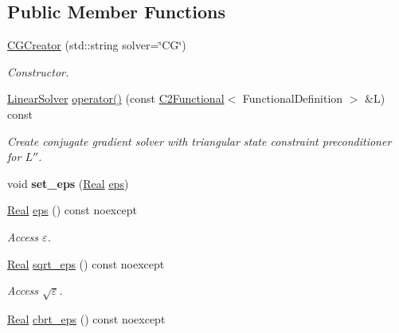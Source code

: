 \subsection*{Public Member Functions}
\begin{DoxyCompactItemize}
\item 
\hyperlink{classSpacy_1_1Kaskade_1_1Lagrange_1_1CGCreator_a238054bebf7f15f35b159a3e1804839d}{C\-G\-Creator} (std\-::string solver=\char`\"{}C\-G\char`\"{})
\begin{DoxyCompactList}\small\item\em Constructor. \end{DoxyCompactList}\item 
\hyperlink{namespaceSpacy_adcd0d78166a9c972b8a2e5a689fc2d03}{Linear\-Solver} \hyperlink{classSpacy_1_1Kaskade_1_1Lagrange_1_1CGCreator_aa9c6be1ff4b871694dc24d026d7d352b}{operator()} (const \hyperlink{classSpacy_1_1Kaskade_1_1C2Functional}{C2\-Functional}$<$ Functional\-Definition $>$ \&L) const 
\begin{DoxyCompactList}\small\item\em Create conjugate gradient solver with triangular state constraint preconditioner for $L''$. \end{DoxyCompactList}\item 
\hypertarget{classSpacy_1_1Mixin_1_1Eps_a818ab6dfab5e4eea583e1302bcc621f8}{void {\bfseries set\-\_\-eps} (\hyperlink{classSpacy_1_1Real}{Real} \hyperlink{classSpacy_1_1Mixin_1_1Eps_a812b99b0abc1d78a34b4114907f23f52}{eps})}\label{classSpacy_1_1Mixin_1_1Eps_a818ab6dfab5e4eea583e1302bcc621f8}

\item 
\hypertarget{classSpacy_1_1Mixin_1_1Eps_a812b99b0abc1d78a34b4114907f23f52}{\hyperlink{classSpacy_1_1Real}{Real} \hyperlink{classSpacy_1_1Mixin_1_1Eps_a812b99b0abc1d78a34b4114907f23f52}{eps} () const noexcept}\label{classSpacy_1_1Mixin_1_1Eps_a812b99b0abc1d78a34b4114907f23f52}

\begin{DoxyCompactList}\small\item\em Access $\varepsilon$. \end{DoxyCompactList}\item 
\hypertarget{classSpacy_1_1Mixin_1_1Eps_a1c1b0ed7f14ed4967dc7da9295a136d4}{\hyperlink{classSpacy_1_1Real}{Real} \hyperlink{classSpacy_1_1Mixin_1_1Eps_a1c1b0ed7f14ed4967dc7da9295a136d4}{sqrt\-\_\-eps} () const noexcept}\label{classSpacy_1_1Mixin_1_1Eps_a1c1b0ed7f14ed4967dc7da9295a136d4}

\begin{DoxyCompactList}\small\item\em Access $\sqrt\varepsilon$. \end{DoxyCompactList}\item 
\hypertarget{classSpacy_1_1Mixin_1_1Eps_a91dbe45e297be2bc53f1a96107a58c64}{\hyperlink{classSpacy_1_1Real}{Real} \hyperlink{classSpacy_1_1Mixin_1_1Eps_a91dbe45e297be2bc53f1a96107a58c64}{cbrt\-\_\-eps} () const noexcept}\label{classSpacy_1_1Mixin_1_1Eps_a91dbe45e297be2bc53f1a96107a58c64}


\end{DoxyCompactItemize}

